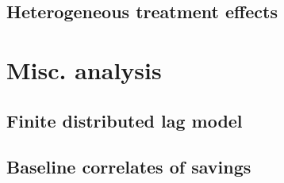 \documentclass[11pt]{article}
\begin{document}
        
        
        
        
        
        
        
        
        

    \clearpage

	\subsection{Heterogeneous treatment effects}

		
		
		
		
		
		
		
		
		
		
		
		
		
		
		
		
		
		
		
		
		

	\clearpage

\section{Misc. analysis}

    \subsection{Finite distributed lag model}

        
        

    \clearpage

    \subsection{Baseline correlates of savings}
\end{document}
